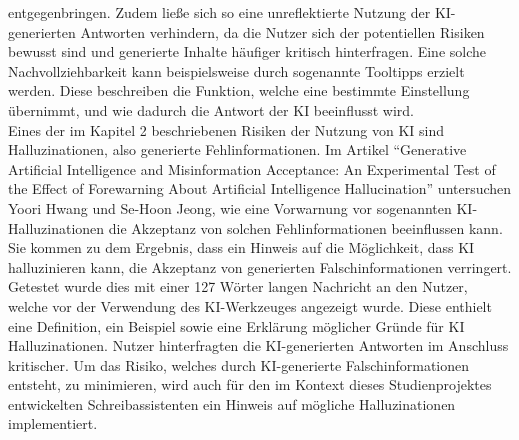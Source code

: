 \documentclass[../main.tex]{subfiles}
\begin{document}
entgegenbringen\cite[10]{influencingUsingAi}. Zudem ließe sich so eine unreflektierte Nutzung der KI-generierten Antworten verhindern, da die Nutzer sich der 
potentiellen Risiken bewusst sind und generierte Inhalte häufiger kritisch hinterfragen\cite[10]{influencingUsingAi}. Eine solche Nachvollziehbarkeit kann 
beispielsweise durch sogenannte Tooltipps erzielt werden. Diese beschreiben die Funktion, welche eine bestimmte Einstellung übernimmt, und wie dadurch die Antwort der 
KI beeinflusst wird.\\  
Eines der im Kapitel 2 beschriebenen Risiken der Nutzung von KI sind Halluzinationen, also generierte Fehlinformationen. Im Artikel "`Generative Artificial Intelligence 
and Misinformation Acceptance: An Experimental Test of the Effect of Forewarning About Artificial Intelligence Hallucination"' untersuchen Yoori Hwang und Se-Hoon Jeong, 
wie eine Vorwarnung vor sogenannten KI-Halluzinationen die Akzeptanz von solchen Fehlinformationen beeinflussen kann. Sie kommen zu dem Ergebnis, dass ein Hinweis auf 
die Möglichkeit, dass KI halluzinieren kann, die Akzeptanz von generierten Falschinformationen verringert. Getestet wurde dies mit einer 127 Wörter langen Nachricht an 
den Nutzer, welche vor der Verwendung des KI-Werkzeuges angezeigt wurde. Diese enthielt eine Definition, ein Beispiel sowie eine Erklärung möglicher Gründe für KI 
Halluzinationen\cite[285]{hallucinationForewarning}. Nutzer hinterfragten die KI-generierten Antworten im Anschluss kritischer. Um das Risiko, welches durch KI-generierte Falschinformationen 
entsteht, zu minimieren, wird auch für den im Kontext dieses Studienprojektes entwickelten Schreibassistenten ein Hinweis auf mögliche Halluzinationen implementiert.\cite{hallucinationForewarning}
\end{document}
